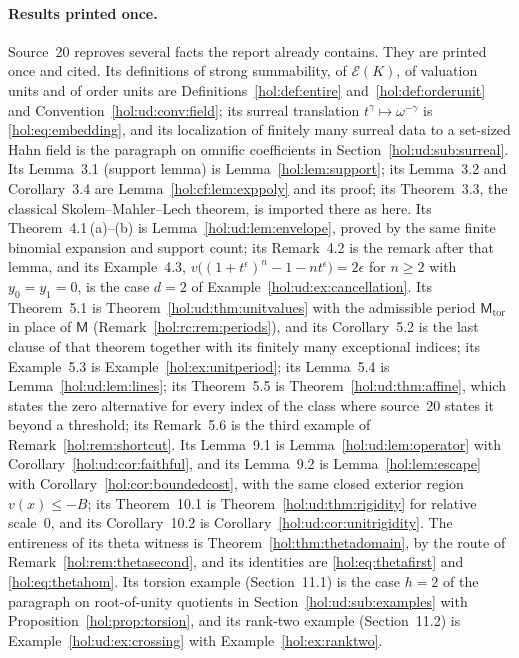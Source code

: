 \documentclass[11pt]{article}
\numberwithin{equation}{section}
\theoremstyle{definition}
\theoremstyle{remark}
\begin{document}
\paragraph{Results printed once.}
Source~20 reproves several facts the report already contains. They are
printed once and cited. Its definitions of strong summability, of
$\mathcal E(K)$, of valuation units and of order units are
Definitions~\ref{hol:def:entire} and~\ref{hol:def:orderunit} and
Convention~\ref{hol:ud:conv:field}; its surreal translation
$t^\gamma\mapsto\omega^{-\gamma}$ is \eqref{hol:eq:embedding}, and its
localization of finitely many surreal data to a set-sized Hahn field is the
paragraph on omnific coefficients in Section~\ref{hol:ud:sub:surreal}. Its
Lemma~3.1 (support lemma) is Lemma~\ref{hol:lem:support}; its Lemma~3.2 and
Corollary~3.4 are Lemma~\ref{hol:cf:lem:exppoly} and its proof; its
Theorem~3.3, the classical Skolem--Mahler--Lech theorem, is imported there as
here. Its Theorem~4.1\,(a)--(b) is Lemma~\ref{hol:ud:lem:envelope}, proved by
the same finite binomial expansion and support count; its Remark~4.2 is the
remark after that lemma, and its Example~4.3,
$v\bigl((1+t^\epsilon)^n-1-nt^\epsilon\bigr)=2\epsilon$ for $n\ge2$ with
$y_0=y_1=0$, is the case $d=2$ of Example~\ref{hol:ud:ex:cancellation}. Its
Theorem~5.1 is Theorem~\ref{hol:ud:thm:unitvalues} with the admissible period
$\mathsf M_{\mathrm{tor}}$ in place of $\mathsf M$
(Remark~\ref{hol:rc:rem:periods}), and its Corollary~5.2 is the last clause of
that theorem together with its finitely many exceptional indices; its
Example~5.3 is Example~\ref{hol:ex:unitperiod}; its Lemma~5.4 is
Lemma~\ref{hol:ud:lem:lines}; its Theorem~5.5 is
Theorem~\ref{hol:ud:thm:affine}, which states the zero alternative for every
index of the class where source~20 states it beyond a threshold; its
Remark~5.6 is the third example of Remark~\ref{hol:rem:shortcut}. Its
Lemma~9.1 is Lemma~\ref{hol:ud:lem:operator} with
Corollary~\ref{hol:ud:cor:faithful}, and its Lemma~9.2 is
Lemma~\ref{hol:lem:escape} with Corollary~\ref{hol:cor:boundedcost}, with the
same closed exterior region $v(x)\le-B$; its Theorem~10.1 is
Theorem~\ref{hol:ud:thm:rigidity} for relative scale~$0$, and its
Corollary~10.2 is Corollary~\ref{hol:ud:cor:unitrigidity}. The entireness of
its theta witness is Theorem~\ref{hol:thm:thetadomain}, by the route of
Remark~\ref{hol:rem:thetasecond}, and its identities are
\eqref{hol:eq:thetafirst} and \eqref{hol:eq:thetahom}. Its torsion example
(Section~11.1) is the case $h=2$ of the paragraph on root-of-unity quotients in
Section~\ref{hol:ud:sub:examples} with Proposition~\ref{hol:prop:torsion}, and
its rank-two example (Section~11.2) is Example~\ref{hol:ud:ex:crossing} with
Example~\ref{hol:ex:ranktwo}.
\end{document}
